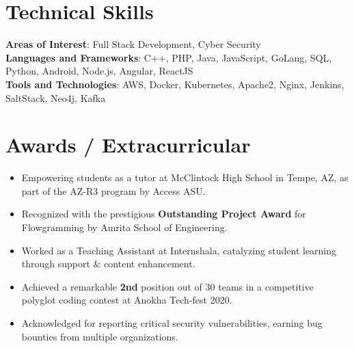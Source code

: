 \documentclass[letterpaper,11pt]{article}
\newcommand{\resumeItem}[1]{
  \item\small{
    {#1 \vspace{-2pt}}
  }
}
\newcommand{\resumeItemListStart}{\begin{itemize}}
\newcommand{\resumeItemListEnd}{\end{itemize}\vspace{-5pt}}
\begin{document}
\section{Technical Skills}
 \begin{itemize}[leftmargin=0.15in, label={}]
    \small{\item{
    \textbf{Areas of Interest}{: Full Stack Development, Cyber Security} \\
     \textbf{Languages and Frameworks}{: C++, PHP, Java, JavaScript, GoLang, SQL, Python, Android, Node.js, Angular, ReactJS} \\
     \textbf{Tools and Technologies}{: AWS, Docker, Kubernetes, Apache2, Nginx, Jenkins, SaltStack, Neo4j, Kafka} \\
    }}
 \end{itemize}
 \vspace{-10pt}


\section{Awards / Extracurricular}
            \resumeItemListStart
                        	\resumeItem{Empowering students as a tutor at McClintock High School in Tempe, AZ, as part of the AZ-R3 program by Access ASU.}\vspace{-5pt}
            	\resumeItem{Recognized with the prestigious \textbf{Outstanding Project Award} for Flowgramming by Amrita School of Engineering.}\vspace{-5pt}
            	\resumeItem{Worked as a Teaching Assistant at Internshala, catalyzing student learning through support \& content enhancement.}
\vspace{-5pt}            	            
                \resumeItem{Achieved a remarkable \textbf{2nd} position out of 30 teams in a competitive polyglot coding contest at Anokha Tech-fest 2020.}\vspace{-5pt}
                \resumeItem{Acknowledged for reporting critical security vulnerabilities, earning bug bounties from multiple organizations.}\vspace{-5pt}
            \resumeItemListEnd
\end{document}
